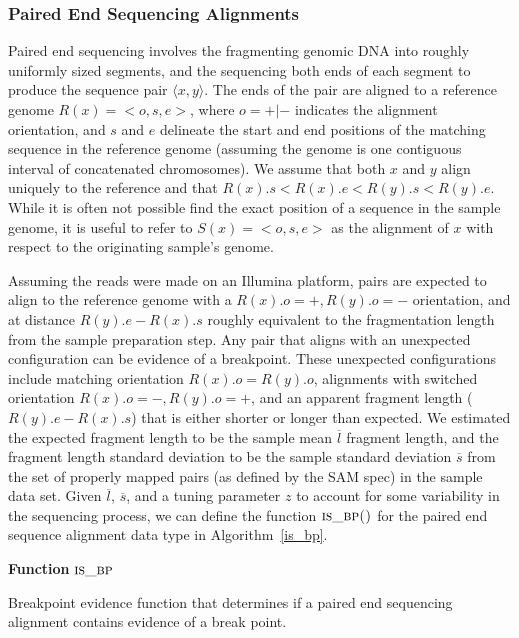 \documentclass[11pt]{article}
\begin{document}
\subsubsection{Paired End Sequencing Alignments}

Paired end sequencing involves the fragmenting genomic DNA into roughly
uniformly sized segments, and the sequencing both ends of each segment to
produce the sequence pair $\langle x,y \rangle$.  The ends of the pair are
aligned to a reference genome $R(x)=<o,s,e>$, where $o=+|-$ indicates the
alignment orientation, and $s$ and $e$ delineate the start and end positions of
the matching sequence in the reference genome (assuming the genome is one
contiguous interval of concatenated chromosomes).  We assume that both $x$ and
$y$ align uniquely to the reference and that $R(x).s<R(x).e<R(y).s<R(y).e$.
While it is often not possible find the exact position of a sequence in the
sample genome, it is useful to refer to  $S(x)=<o,s,e>$ as the alignment of $x$
with respect to the originating sample's genome.

Assuming the reads were made on an Illumina platform, pairs are expected to
align to the reference genome with a $R(x).o=+, R(y).o=-$ orientation, and at
distance $R(y).e - R(x).s$ roughly equivalent to the fragmentation length from
the sample preparation step.  Any pair that aligns with an unexpected
configuration can be evidence of a breakpoint.  These unexpected configurations
include matching orientation $R(x).o = R(y).o$, alignments with switched
orientation $R(x).o=-, R(y).o=+$, and an apparent fragment length ($R(y).e -
R(x).s$) that is either shorter or longer than expected.  We estimated the
expected fragment length to be the sample mean $\overline{l}$ fragment length,
and the fragment length standard deviation to be the sample standard deviation
$\overline{s}$ from the set of properly mapped pairs (as defined by the SAM
spec) in the sample data set.  Given $\overline{l}$, $\overline{s}$, and a
tuning parameter $z$ to account for some variability in the sequencing process,
we can define the function $\textsc{is\_bp()}$ for the paired end sequence
alignment data type in Algorithm~\ref{is_bp}.

\begin{algorithm}[H]
    \DontPrintSemicolon
    \footnotesize
    \BlankLine
    \textbf{Function} $\textsc{is\_bp}$\;
	\caption{Breakpoint evidence function that determines if a paired end
			 sequencing alignment contains evidence of a break point.}
    \label{is_bp}
\end{algorithm}
\end{document}

